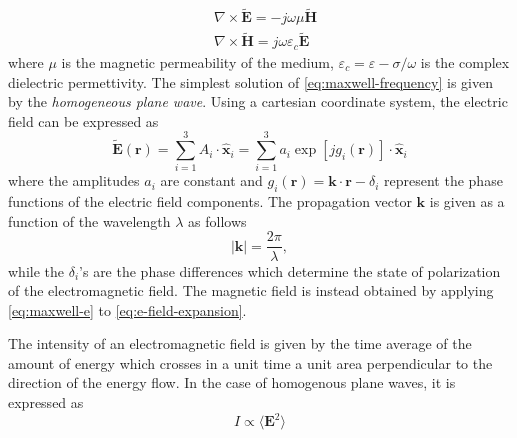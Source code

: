 \begin{subequations}\label{eq:maxwell-frequency}
\begin{align}
& \nabla \times \widetilde{\textbf{E}} = -j\omega\mu\widetilde{\textbf{H}} \label{eq:maxwell-e}\\
& \nabla \times \widetilde{\textbf{H}} = j\omega\varepsilon_c\widetilde{\textbf{E}}\label{eq:maxwell-h}
\end{align}
\end{subequations}
where $\mu$ is the magnetic permeability of the medium, $\varepsilon_c = \varepsilon - \sigma/\omega$ is the complex dielectric permettivity. The simplest solution of \autoref{eq:maxwell-frequency} is given by the \emph{homogeneous plane wave}. Using a cartesian coordinate system, the electric field can be expressed as
\begin{equation}\label{eq:e-field-expansion}
		\widetilde{\textbf{E}}(\textbf{r}) = \sum_{i=1}^3 A_i \cdot \hat{\textbf{x}}_i  = \sum_{i=1}^3 a_i \exp\left[jg_i(\textbf{r})\right]  \cdot \hat{\textbf{x}}_i
\end{equation}
where the amplitudes $a_i$ are constant and $g_i(\textbf{r}) = \textbf{k}\cdot\textbf{r} - \delta_i$ represent the phase functions of the electric field components. The propagation vector $\textbf{k}$ is given as a function of the wavelength $\lambda$ as follows
\begin{equation}
	|\textbf{k}| = \frac{2\pi}{\lambda},
\end{equation}
while the $\delta_i$'s are the phase differences which determine the state of polarization of the electromagnetic field. The magnetic field is instead obtained by applying \autoref{eq:maxwell-e} to \autoref{eq:e-field-expansion}. 

The intensity of an electromagnetic field is given by the time average of the amount of energy which crosses in a unit time a unit area perpendicular to the direction of the energy flow. In the case of homogenous plane waves, it is expressed as
\begin{equation}\label{eq:intensity}
	I \propto \langle \textbf{E}^2 \rangle
\end{equation}


